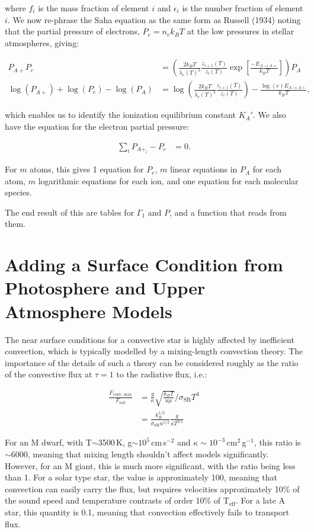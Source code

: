 \documentclass[12pt]{article}
\begin{document}
where $f_i$ is the mass fraction of element $i$ and $\epsilon_i$ is the number fraction of element $i$. We now re-phrase the Saha equation as the same form as Russell (1934) noting that the partial pressure of electrons, $P_e = n_e k_B T$ at the low pressures in stellar atmospheres, giving:

\begin{align}
P_{A+}P_e &= \left( \frac{2 k_B T}{\lambda_e(T)^3} \frac{z_{i+1}(T)}{z_i(T)} \exp \left[  \frac{-E_{A \rightarrow A+}}{k_B T} \right] \right) P_A \\
\log(P_{A+}) + \log(P_e) - \log(P_A) &= \log\left( \frac{2 k_B T}{\lambda_e(T)^3} \frac{z_{i+1}(T)}{z_i(T)} \right) - \frac{\log(e) E_{A \rightarrow A+}}{k_B T} ,
\end{align}

which enables us to identify the ionization equilibrium constant $K_A'$. We also have the equation for the electron partial pressure:

\begin{align}
\sum_i P_{A+_i}  - P_e &= 0.
\end{align}

For $m$ atoms, this gives 1 equation for $P_e$, $m$ linear equations in $P_A$ for each atom, $m$ logarithmic equations for each ion, and one equation for each molecular species. 

The end result of this are tables for $\Gamma_1$ and $P$, and a function that reads from them.

\section{Adding a Surface Condition from Photosphere and Upper Atmosphere Models}

The near surface conditions for a convective star is highly affected by inefficient convection, which is typically modelled by a mixing-length convection theory. The importance of the details of such a theory can be considered roughly as the ratio of the convective flux at $\tau=1$ to the radiative flux, i.e.:

\begin{align}
\frac{F_\text{conv, max}}{F_\text{rad}} &= \frac{g}{\kappa} \sqrt{\frac{k_B T}{u \mu}}  / \sigma_\text{SB} T^4 \\
&= \frac{k_B^{1/2}}{\sigma_\text{SB} u^{1/2}} \frac{g}{\kappa T^{3.5}}
\end{align}

For an M dwarf, with T$\sim$3500\,K, g$\sim10^{5}$\,cm\,s$^{-2}$ and $\kappa \sim 10^{-3}$\,cm$^2$\,g$^{-1}$, this ratio is $\sim$6000, meaning that mixing length shouldn't affect models significantly. However, for an M giant, this is much more significant, with the ratio being less than 1. For a solar type star, the value is approximately 100, meaning that convection can easily carry the flux, but requires velocities approximately 10\% of the sound speed and temperature contrasts of order 10\% of T$_\text{eff}$. For a late A star, this quantity is 0.1, meaning that convection effectively fails to transport flux.
\end{document}
